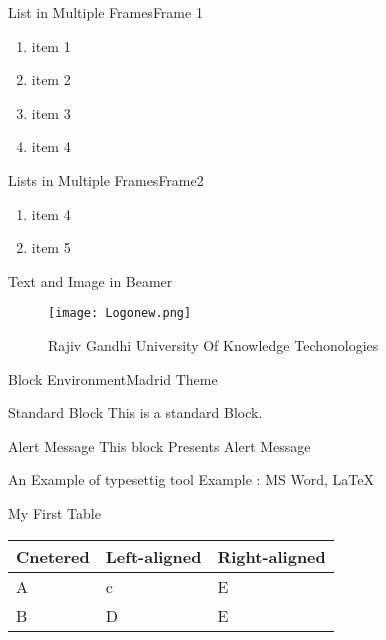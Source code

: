 \documentclass{beamer}
\newcounter{currentenumi}
\begin{document}
\begin{frame}{List in Multiple Frames}{Frame 1}
\begin{enumerate}
    \item item 1
    \item item 2
    \item item 3
    \item item 4
    \setcounter{currentenumi}{\theenumi}
\end{enumerate}
\end{frame}

\begin{frame}{Lists in Multiple Frames}{Frame2}

\begin{enumerate}
\setcounter{enumi}{\thecurrentenumi}
    \item item 4
    \item item 5
\end{enumerate}  
\end{frame}

\begin{frame}{Text and Image in Beamer}

            \begin{figure}
                \centering
                \texttt{[image: Logonew.png]}
                \caption{Rajiv Gandhi University Of Knowledge Techonologies}
                \label{fig:my_label}
            \end{figure}

    
\end{frame}

\begin{frame}{Block Environment}{Madrid Theme}
    \begin{block}{Standard Block}
        This is a standard Block.
    \end{block}
    \begin{alertblock}{Alert Message}
        This block Presents Alert Message
    \end{alertblock}
    \begin{exampleblock}{An Example of typesettig tool}
        Example : MS Word, \LaTeX{}
        
    \end{exampleblock}
\end{frame}

\begin{frame}{My First Table}
\begin{table}[h]
\begin{tabular}{l|l|l}
        Cnetered & Left-aligned & Right-aligned \\
\hline
        A & c & E \\
\hline
        B & D & E \\

\end{tabular}
\end{table}
\end{frame}
\end{document}
